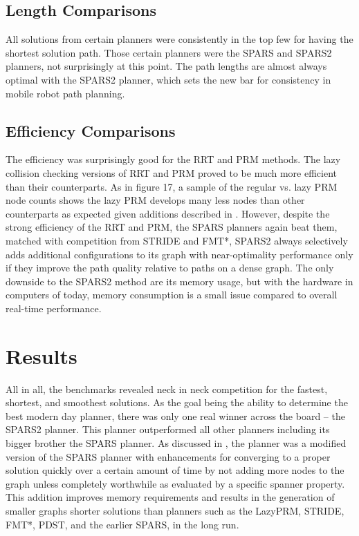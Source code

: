 \documentclass[conference]{IEEEtran} \usepackage[T1]{fontenc} \usepackage[backend=biber, style=ieee]{biblatex}
\begin{document}
\subsection{Length Comparisons} \label{Length Comparisons}
All solutions from certain planners were consistently in the top few for having the shortest solution path. Those certain planners were the SPARS and SPARS2 planners, not 
surprisingly at this point. The path lengths are almost always optimal with the SPARS2 planner, which sets the new bar for consistency in mobile robot path planning.

\subsection{Efficiency Comparisons} \label{Efficiency Comparisons}
The efficiency was surprisingly good for the RRT and PRM methods. The lazy collision checking versions of RRT and PRM proved to be much more efficient than their counterparts.
As in figure 17, a sample of the regular vs. lazy PRM node counts shows the lazy PRM develops many less nodes than other counterparts as expected given additions described in
\cite{lazy_prm}. However, despite the strong efficiency of the RRT and PRM, the SPARS planners again beat them, matched with competition from STRIDE and FMT*, SPARS2 always
selectively adds additional configurations to its graph with near-optimality performance only if they improve the path quality relative to paths on a dense graph. The only
downside to the SPARS2 method are its memory usage, but with the hardware in computers of today, memory consumption is a small issue compared to overall real-time performance.

\section{Results} \label{Results}

All in all, the benchmarks revealed neck in neck competition for the fastest, shortest, and smoothest solutions. As the goal being the ability to determine the best modern day
planner, there was only one real winner across the board -- the SPARS2 planner. This planner outperformed all other planners including its bigger brother the SPARS planner. 
As discussed in \cite{spars_two}, the planner was a modified version of the SPARS planner with enhancements for converging to a proper solution quickly over a certain amount of
time by not adding more nodes to the graph unless completely worthwhile as evaluated by a specific spanner property. This addition improves memory requirements and results
in the generation of smaller graphs shorter solutions than planners such as the LazyPRM, STRIDE, FMT*, PDST, and the earlier SPARS, in the long run.
\end{document}
